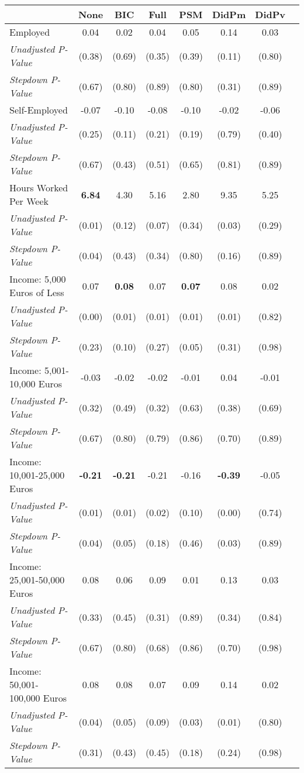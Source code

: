 \begin{tabular}{l c c c c c c c}
\toprule
 & None & BIC & Full & PSM & DidPm & DidPv \\
\midrule
Employed & 0.04 & 0.02 & 0.04 & 0.05 & 0.14 & 0.03 \\
\quad \textit{Unadjusted P-Value} & (0.38) & (0.69) & (0.35) & (0.39) & (0.11) & (0.80) \\
\quad \textit{Stepdown P-Value} & (0.67) & (0.80) & (0.89) & (0.80) & (0.31) & (0.89) \\
Self-Employed & -0.07 & -0.10 & -0.08 & -0.10 & -0.02 & -0.06 \\
\quad \textit{Unadjusted P-Value} & (0.25) & (0.11) & (0.21) & (0.19) & (0.79) & (0.40) \\
\quad \textit{Stepdown P-Value} & (0.67) & (0.43) & (0.51) & (0.65) & (0.81) & (0.89) \\
Hours Worked Per Week & \textbf{ 6.84 } & 4.30 & 5.16 & 2.80 & 9.35 & 5.25 \\
\quad \textit{Unadjusted P-Value} & (0.01) & (0.12) & (0.07) & (0.34) & (0.03) & (0.29) \\
\quad \textit{Stepdown P-Value} & (0.04) & (0.43) & (0.34) & (0.80) & (0.16) & (0.89) \\
Income: 5,000 Euros of Less & 0.07 & \textbf{ 0.08 } & 0.07 & \textbf{ 0.07 } & 0.08 & 0.02 \\
\quad \textit{Unadjusted P-Value} & (0.00) & (0.01) & (0.01) & (0.01) & (0.01) & (0.82) \\
\quad \textit{Stepdown P-Value} & (0.23) & (0.10) & (0.27) & (0.05) & (0.31) & (0.98) \\
Income: 5,001-10,000 Euros & -0.03 & -0.02 & -0.02 & -0.01 & 0.04 & -0.01 \\
\quad \textit{Unadjusted P-Value} & (0.32) & (0.49) & (0.32) & (0.63) & (0.38) & (0.69) \\
\quad \textit{Stepdown P-Value} & (0.67) & (0.80) & (0.79) & (0.86) & (0.70) & (0.89) \\
Income: 10,001-25,000 Euros & \textbf{ -0.21 } & \textbf{ -0.21 } & -0.21 & -0.16 & \textbf{ -0.39 } & -0.05 \\
\quad \textit{Unadjusted P-Value} & (0.01) & (0.01) & (0.02) & (0.10) & (0.00) & (0.74) \\
\quad \textit{Stepdown P-Value} & (0.04) & (0.05) & (0.18) & (0.46) & (0.03) & (0.89) \\
Income: 25,001-50,000 Euros & 0.08 & 0.06 & 0.09 & 0.01 & 0.13 & 0.03 \\
\quad \textit{Unadjusted P-Value} & (0.33) & (0.45) & (0.31) & (0.89) & (0.34) & (0.84) \\
\quad \textit{Stepdown P-Value} & (0.67) & (0.80) & (0.68) & (0.86) & (0.70) & (0.98) \\
Income: 50,001-100,000 Euros & 0.08 & 0.08 & 0.07 & 0.09 & 0.14 & 0.02 \\
\quad \textit{Unadjusted P-Value} & (0.04) & (0.05) & (0.09) & (0.03) & (0.01) & (0.80) \\
\quad \textit{Stepdown P-Value} & (0.31) & (0.43) & (0.45) & (0.18) & (0.24) & (0.98) \\
\bottomrule
\end{tabular}
